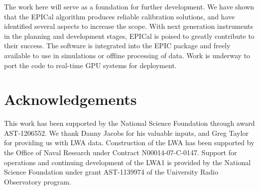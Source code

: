 \documentclass[a4paper,fleqn,usenatbib]{mnras}
\begin{document}
The work here will serve as a foundation for further development. We have shown that the EPICal algorithm produces reliable calibration solutions, and have identified several aspects to increase the scope. With next generation instruments in the planning and development stages, EPICal is poised to greatly contribute to their success. The software is integrated into the EPIC package and freely available to use in simulations or offline processing of data. Work is underway to port the code to real-time GPU systems for deployment. 

\section*{Acknowledgements}
This work has been supported by the National Science Foundation through award AST-1206552. 
We thank Danny Jacobs for his valuable inputs, and Greg Taylor for providing us with LWA data. 
Construction of the LWA has been supported by the Office of Naval Research under 
Contract N00014-07-C-0147. Support for operations and continuing development of 
the LWA1 is provided by the National Science Foundation under grant AST-1139974 
of the University Radio Observatory program.








\bsp	%
\label{lastpage}
\end{document}
